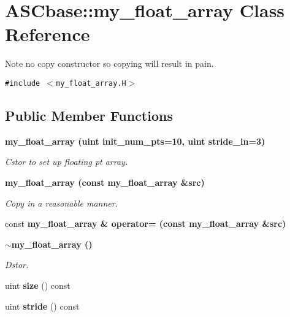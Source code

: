 \section{ASCbase::my\_\-float\_\-array Class Reference}
\label{classASCbase_1_1my__float__array}
Note no copy constructor so copying will result in pain.  


{\tt \#include $<$my\_\-float\_\-array.H$>$}

\subsection*{Public Member Functions}
\begin{CompactItemize}
\item 
\bf{my\_\-float\_\-array} (uint init\_\-num\_\-pts=10, uint stride\_\-in=3)\label{classASCbase_1_1my__float__array_d9b0cb450e669b9e4b7bdced7c36a466}

\begin{CompactList}\small\item\em Cstor to set up floating pt array. \item\end{CompactList}\item 
\bf{my\_\-float\_\-array} (const \bf{my\_\-float\_\-array} \&src)\label{classASCbase_1_1my__float__array_a6269a44c631f4fe16c92229f4f128e5}

\begin{CompactList}\small\item\em Copy in a reasonable manner. \item\end{CompactList}\item 
const \bf{my\_\-float\_\-array} \& \bf{operator=} (const \bf{my\_\-float\_\-array} \&src)
\item 
\bf{$\sim$my\_\-float\_\-array} ()\label{classASCbase_1_1my__float__array_604d58f23c22a431770fb11f97fc2a99}

\begin{CompactList}\small\item\em Dstor. \item\end{CompactList}\item 
uint \textbf{size} () const \label{classASCbase_1_1my__float__array_c15df63500d30ce66dee8a118b69821d}

\item 
uint \textbf{stride} () const \label{classASCbase_1_1my__float__array_ca02b23f8fd6e8a60a28e4cfae8a648e}


\end{CompactItemize}
